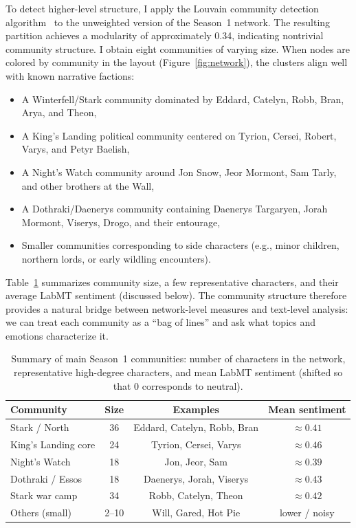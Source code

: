 \documentclass[9pt,twocolumn,twoside]{pnas-new}
\begin{document}
To detect higher-level structure, I apply the Louvain community detection algorithm~\cite{blondel2008} to the unweighted version of the Season~1 network. The resulting partition achieves a modularity of approximately 0.34, indicating nontrivial community structure. I obtain eight communities of varying size. When nodes are colored by community in the layout (Figure~\ref{fig:network}), the clusters align well with known narrative factions:

\begin{itemize}
    \item A Winterfell/Stark community dominated by Eddard, Catelyn, Robb, Bran, Arya, and Theon,
    \item A King’s Landing political community centered on Tyrion, Cersei, Robert, Varys, and Petyr Baelish,
    \item A Night’s Watch community around Jon Snow, Jeor Mormont, Sam Tarly, and other brothers at the Wall,
    \item A Dothraki/Daenerys community containing Daenerys Targaryen, Jorah Mormont, Viserys, Drogo, and their entourage,
    \item Smaller communities corresponding to side characters (e.g., minor children, northern lords, or early wildling encounters).
\end{itemize}

Table~\ref{tab:communities} summarizes community size, a few representative characters, and their average LabMT sentiment (discussed below). The community structure therefore provides a natural bridge between network-level measures and text-level analysis: we can treat each community as a “bag of lines” and ask what topics and emotions characterize it.

\begin{table}[t!]
    \centering
    \caption{Summary of main Season~1 communities: number of characters in the network, representative high-degree characters, and mean LabMT sentiment (shifted so that 0 corresponds to neutral).}
    \label{tab:communities}
    \begin{tabular}{lccc}
        \toprule
        Community & Size & Examples & Mean sentiment \\
        \midrule
        Stark / North       & 36 & Eddard, Catelyn, Robb, Bran     & $\approx 0.41$ \\
        King's Landing core & 24 & Tyrion, Cersei, Varys           & $\approx 0.46$ \\
        Night's Watch       & 18 & Jon, Jeor, Sam                  & $\approx 0.39$ \\
        Dothraki / Essos    & 18 & Daenerys, Jorah, Viserys        & $\approx 0.43$ \\
        Stark war camp      & 34 & Robb, Catelyn, Theon            & $\approx 0.42$ \\
        Others (small)      & 2--10 & Will, Gared, Hot Pie         & lower / noisy \\
        \bottomrule
    \end{tabular}
\end{table}
\end{document}
